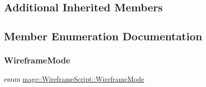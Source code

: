 \subsection*{Additional Inherited Members}


\subsection{Member Enumeration Documentation}
\hypertarget{classmage_1_1_wireframe_script_a99d65e77e89c2581544e68030adcefb7}{}\label{classmage_1_1_wireframe_script_a99d65e77e89c2581544e68030adcefb7} 
\subsubsection{\texorpdfstring{Wireframe\+Mode}{WireframeMode}}
{\footnotesize\ttfamily enum \hyperlink{classmage_1_1_wireframe_script_a99d65e77e89c2581544e68030adcefb7}{mage\+::\+Wireframe\+Script\+::\+Wireframe\+Mode}\hspace{0.3cm}{\ttfamily [strong]}}

